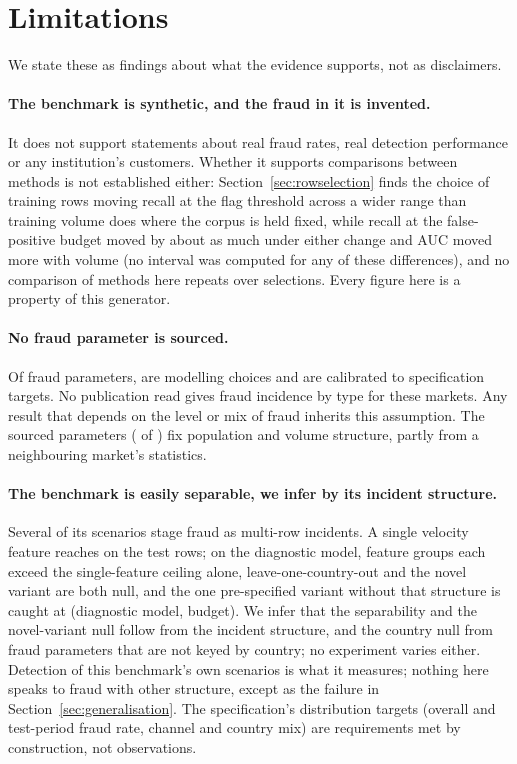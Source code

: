 \section{Limitations}
\label{sec:limitations}

We state these as findings about what the evidence supports, not as disclaimers.

\paragraph{The benchmark is synthetic, and the fraud in it is invented.} It does not support statements about
real fraud rates, real detection performance or any institution's customers. Whether it supports
comparisons between methods is not established either: Section~\ref{sec:rowselection} finds the
choice of training rows moving recall at the flag threshold across a wider range than training volume
does where the corpus is held fixed, while recall at the false-positive budget moved by about as much under either
change and AUC moved more with volume (no interval was computed
for any of these differences), and
no comparison of methods here repeats over selections. Every figure here is a property of this
generator.

\paragraph{No fraud parameter is sourced.} Of \nProvFraudTotal{} fraud parameters,
\nProvFraudAssumed{} are modelling choices and \nProvFraudCalibrated{} are calibrated to
specification targets. No publication read gives fraud incidence by type for these markets. Any
result that depends on the level or mix of fraud inherits this assumption. The sourced parameters (\nProvSourced{} of \nProvTotal{}) fix
population and volume structure, partly from a neighbouring market's statistics.

\paragraph{The benchmark is easily separable, we infer by its incident structure.} Several of its scenarios stage
fraud as multi-row incidents. A single velocity feature reaches \nGateFloor{} on the test rows; on the diagnostic model,
\nGroupsAboveCeiling{} feature groups each exceed the single-feature ceiling alone,
leave-one-country-out and the novel variant are both null, and the one pre-specified variant
without that structure is caught at \nRevRecall{} (diagnostic model, \nFPRBudget{} budget). We infer that the separability and the novel-variant null follow from
the incident structure, and the country null from fraud parameters that are not keyed by country; no
experiment varies either. Detection of this benchmark's own scenarios is what it measures;
nothing here speaks to fraud with other structure, except as the failure in
Section~\ref{sec:generalisation}. The specification's distribution targets (overall and test-period
fraud rate, channel and country mix) are requirements met by construction, not observations.

